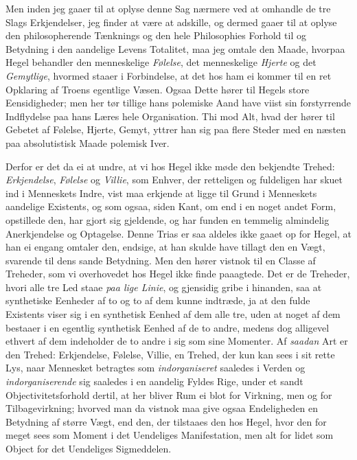 \documentclass[12pt,a4paper]{book}
\newcommand{\apage}[1]{\marginnote{\footnotesize\textit{[#1]}}}
\begin{document}
Men inden jeg gaaer til at oplyse denne Sag nærmere ved at omhandle de tre
Slags Erkjendelser, jeg finder at være at adskille, og dermed gaaer til at
oplyse den philosopherende Tænknings og den hele Philosophies Forhold til
og Betydning i den aandelige Levens Totalitet, maa jeg omtale den Maade,
hvorpaa Hegel behandler den menneskelige \emph{Følelse}, det menneskelige \emph{Hjerte}
og det \emph{Gemytlige}, hvormed staaer i Forbindelse, at det hos ham ei kommer
til en ret Opklaring af Troens egentlige Væsen. Ogsaa Dette hører til
Hegels store Eensidigheder; men her tør tillige hans polemiske Aand have
viist sin forstyrrende Indflydelse paa hans Læres hele Organisation. Thi
mod Alt, hvad der hører til Gebetet af Følelse, Hjerte, Gemyt, yttrer han
sig paa flere Steder med en næsten paa absolutistisk Maade polemisk Iver.

Derfor er det da ei at undre, at vi hos Hegel ikke møde den bekjendte
Trehed: \emph{Erkjendelse}, \emph{Følelse} og \emph{Villie}, som Enhver, der retteligen og
fuldeligen har skuet ind i Menneskets Indre, vist maa erkjende at ligge til
Grund i Menneskets aandelige Existents, og som ogsaa, siden Kant, om end i
en noget andet Form, opstillede den, har gjort sig gjeldende, og har funden
en temmelig almindelig Anerkjendelse og Optagelse. Denne Trias er saa
aldeles ikke gaaet op for Hegel, at han ei engang omtaler den, endsige, at
han skulde have tillagt den en Vægt, svarende til dens sande Betydning. Men
den hører vistnok til en Classe af Treheder, som vi overhovedet hos Hegel
ikke finde paaagtede. Det er de Treheder, hvori alle tre Led staae \emph{paa lige
Linie}, og gjensidig gribe i hinanden, saa at synthetiske Eenheder af to og
to af dem kunne indtræde, ja at den fulde Existents viser sig i en
synthetisk Eenhed af dem alle tre, uden at noget af dem \apage{97} bestaaer i en
egentlig synthetisk Eenhed af de to andre, medens dog alligevel ethvert af
dem indeholder de to andre i sig som sine Momenter. Af \emph{saadan} Art er den
Trehed: Erkjendelse, Følelse, Villie, en Trehed, der kun kan sees i sit
rette Lys, naar Mennesket betragtes som \emph{indorganiseret} saaledes i Verden og
\emph{indorganiserende} sig saaledes i en aandelig Fyldes Rige, under et sandt
Objectivitetsforhold dertil, at her bliver Rum ei blot for Virkning, men og
for Tilbagevirkning; hvorved man da vistnok maa give ogsaa Endeligheden en
Betydning af større Vægt, end den, der tilstaaes den hos Hegel, hvor den
for meget sees som Moment i det Uendeliges Manifestation, men alt for lidet
som Object for det Uendeliges Sigmeddelen.
\end{document}
